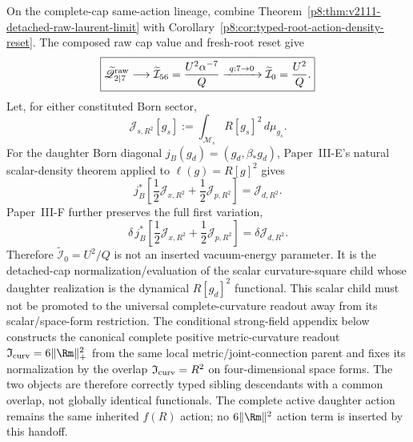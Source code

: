\documentclass[12pt,a4paper]{article}
\begin{document}
\begin{corollary}
\label{p8:cor:v2111-cap-daughter-r2-handoff}
On the complete-cap same-action lineage, combine
Theorem~\ref{p8:thm:v2111-detached-raw-laurent-limit} with
Corollary~\ref{p8:cor:typed-root-action-density-reset}.  The composed raw cap
value and fresh-root reset give
\begin{equation}
\label{p8:eq:v2111-cap-reset-chain}
 \boxed{
 \widetilde{\mathscr Q}_{2\mid7}^{\rm raw}
 \longrightarrow
 \widetilde{\mathcal I}_{56}=\frac{U^2\alpha^{-7}}Q
 \xrightarrow{\ q:7\to0\ }
 \widetilde{\mathcal I}_0=\frac{U^2}{Q}.}
\end{equation}
Let, for either constituted Born sector,
\[
 \mathcal J_{s,R^2}[g_s]
 :=\int_{\mathcal M_s}R[g_s]^2\,d\mu_{g_s}.
\]
For the daughter Born diagonal \(j_B(g_d)=(g_d,\beta_*g_d)\), Paper~III-E's
natural scalar-density theorem applied to \(\ell(g)=R[g]^2\) gives
\begin{equation}
\label{p8:eq:v2111-born-r2-handoff}
 \boxed{
 j_B^*\!\left[
 \frac12\mathcal J_{x,R^2}+\frac12\mathcal J_{p,R^2}
 \right]
 =\mathcal J_{d,R^2}.}
\end{equation}
Paper~III-F further preserves the full first variation,
\begin{equation}
\label{p8:eq:v2111-born-r2-variation}
 \boxed{
 \delta\,j_B^*\!\left[
 \frac12\mathcal J_{x,R^2}+\frac12\mathcal J_{p,R^2}
 \right]
 =\delta\mathcal J_{d,R^2}.}
\end{equation}
Therefore \(\widetilde{\mathcal I}_0=U^2/Q\) is not an inserted vacuum-energy
parameter.  It is the detached-cap normalization/evaluation of the scalar
curvature-square child whose daughter realization is the dynamical
\(R[g_d]^2\) functional.  This scalar child must not be promoted to the
universal complete-curvature readout away from its scalar/space-form
restriction.  The conditional strong-field appendix below constructs the
canonical complete positive metric-curvature readout
\(\mathfrak I_{\rm curv}=6\lVert\Rm\rVert_+^2\) from the same local
metric/joint-connection parent and fixes its normalization by the overlap
\(\mathfrak I_{\rm curv}=R^2\) on four-dimensional space forms.  The two
objects are therefore correctly typed sibling descendants with a common
overlap, not globally identical functionals.  The complete active daughter
action remains the same inherited \(f(R)\) action; no
\(6\lVert\Rm\rVert^2\) action term is inserted by this handoff.
\end{corollary}
\end{document}

